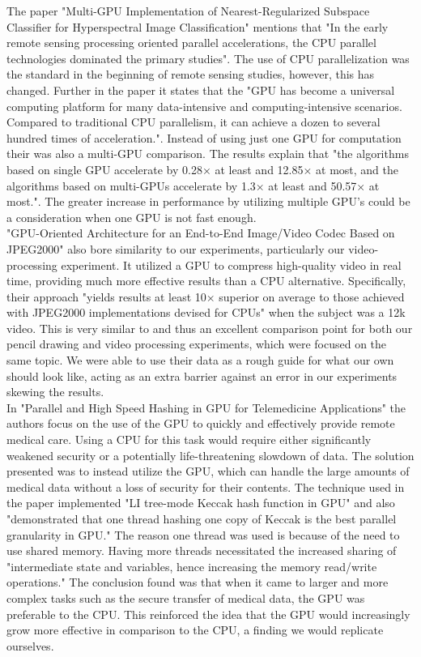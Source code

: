 \documentclass[conference]{IEEEtran}
\begin{document}
The paper "Multi-GPU Implementation of Nearest-Regularized Subspace Classifier for Hyperspectral Image Classification" mentions that "In the early remote sensing processing oriented parallel accelerations, the CPU parallel technologies dominated the primary studies"\cite{Ni}. The use of CPU parallelization was the standard in the beginning of remote sensing studies, however, this has changed. Further in the paper it states that the "GPU has become a universal computing platform for many data-intensive and computing-intensive scenarios. Compared to traditional CPU parallelism, it can achieve a dozen to several hundred times of acceleration."\cite{Ni}. Instead of using just one GPU for computation their was also a multi-GPU comparison. The results explain that "the algorithms based on single GPU accelerate by 0.28× at least and 12.85× at most, and the algorithms based on multi-GPUs accelerate by 1.3× at least and 50.57× at most."\cite{Ni}. The greater increase in performance by utilizing multiple GPU's could be a consideration when one GPU is not fast enough.\\
"GPU-Oriented Architecture for an End-to-End Image/Video Codec Based on JPEG2000" also bore similarity to our experiments, particularly our video-processing experiment. It utilized a GPU to compress high-quality video in real time, providing much more effective results than a CPU alternative. Specifically, their approach "yields results at least 10× superior on average to those achieved with JPEG2000 implementations devised for CPUs" when the subject was a 12k video\cite{Cea-Dominguez}. This is very similar to and thus an excellent comparison point for both our pencil drawing and video processing experiments, which were focused on the same topic. We were able to use their data as a rough guide for what our own should look like, acting as an extra barrier against an error in our experiments skewing the results.\\
In "Parallel and High Speed Hashing in GPU for Telemedicine Applications" the authors focus on the use of the GPU to quickly and effectively provide remote medical care. Using a CPU for this task would require either significantly weakened security or a potentially life-threatening slowdown of data. The solution presented was to instead utilize the GPU, which can handle the large amounts of medical data without a loss of security for their contents. The technique used in the paper implemented "LI tree-mode Keccak hash function in GPU" and also "demonstrated that one thread hashing one copy of Keccak is the best parallel granularity in GPU."\cite{Lee} The reason one thread was used is because of the need to use shared memory. Having more threads necessitated the increased sharing of "intermediate state and variables, hence increasing the memory read/write operations."\cite{Lee} The conclusion found was that when it came to larger and more complex tasks such as the secure transfer of medical data, the GPU was preferable to the CPU. This reinforced the idea that the GPU would increasingly grow more effective in comparison to the CPU, a finding we would replicate ourselves.\\
\end{document}
